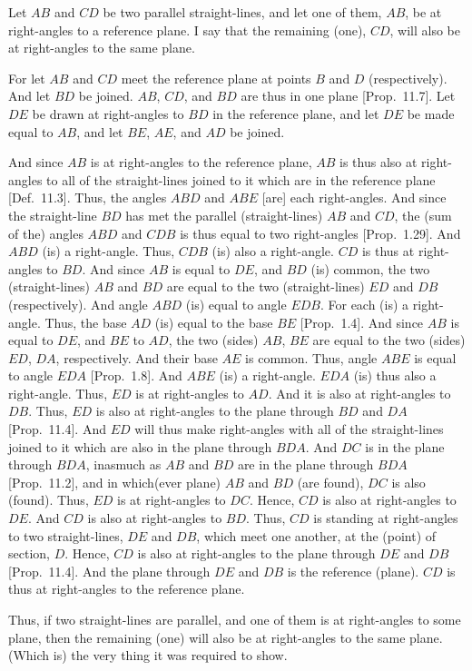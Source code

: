 \begin{Parallel}{}{}
{Let $AB$ and $CD$ be two parallel straight-lines, and let one of them, $AB$,
be at right-angles to a reference plane. I say that the remaining (one), $CD$,
will also be at right-angles to the same plane.

For let $AB$ and $CD$ meet the reference plane at points $B$ and $D$
(respectively). And let $BD$ be joined. $AB$, $CD$, and $BD$
are thus in one plane [Prop.~11.7]. 
Let $DE$ be drawn at right-angles to $BD$ in the reference plane, and
let $DE$ be made equal to $AB$, and let $BE$, $AE$, and $AD$ be
joined.

\epsfysize=2.5in
\centerline{}

And since $AB$ is at right-angles to the reference plane, $AB$ is thus also
at right-angles to all of the straight-lines joined to it which are in the
reference plane [Def.~11.3].  Thus, the angles $ABD$ and $ABE$ [are] each right-angles. And since the straight-line $BD$ has
met the parallel (straight-lines) $AB$ and $CD$, the (sum of the) angles
$ABD$ and $CDB$ is thus equal to two right-angles [Prop.~1.29]. And $ABD$ (is) a right-angle. Thus, $CDB$ (is)
also a right-angle. $CD$ is thus at right-angles to $BD$. And since $AB$
is equal to $DE$, and $BD$ (is) common, the two (straight-lines) $AB$ and
$BD$ are equal to the two (straight-lines) $ED$ and $DB$ (respectively). And angle
$ABD$ (is) equal to angle $EDB$. For each (is) a right-angle.
Thus, the base $AD$ (is) equal to the base $BE$ [Prop.~1.4]. And since $AB$ is equal to $DE$, and $BE$ to $AD$, 
the two (sides) $AB$, $BE$ are equal to the two (sides) $ED$, $DA$,
respectively. And their base $AE$ is common. Thus, angle $ABE$ is equal to
angle $EDA$ [Prop.~1.8]. And $ABE$ (is) a
right-angle. $EDA$ (is) thus also a right-angle. Thus, $ED$ is
at right-angles to $AD$. And it is also at right-angles to $DB$. Thus, $ED$
is also at right-angles to the plane through $BD$ and $DA$ [Prop.~11.4]. And $ED$ will thus  make right-angles
with all of the straight-lines joined to it which are also in the plane through
$BDA$. And $DC$ is in the plane through $BDA$, inasmuch as
$AB$ and $BD$ are in the plane through $BDA$ [Prop.~11.2], and in which(ever plane)
$AB$ and $BD$ (are found), $DC$ is also (found). Thus, $ED$ is at right-angles to $DC$. Hence, $CD$ is also at right-angles to $DE$. And
$CD$ is also at right-angles to $BD$. Thus, $CD$ is standing  at right-angles
to two straight-lines, $DE$ and $DB$, which meet one another, at the 
(point) of section, $D$. Hence, $CD$ is also at
right-angles to the plane through $DE$ and $DB$ [Prop.~11.4]. And the plane through $DE$ and $DB$ is the reference
(plane). $CD$ is thus at right-angles to the reference plane.

Thus, if  two  straight-lines are parallel, and one of them is at right-angles to some plane, then the remaining (one) will also
be at right-angles to the same plane. (Which is) the very thing it was required to show.}
\end{Parallel}

